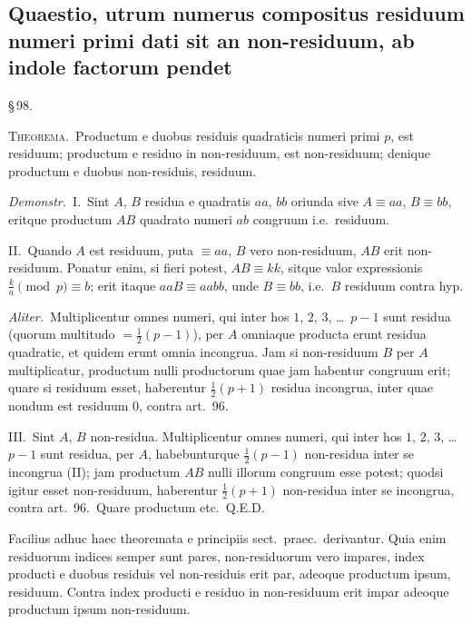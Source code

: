 \documentclass[12pt,a4paper]{article}
\theoremstyle{plain}
\theoremstyle{definition}
\theoremstyle{remark}
\begin{document}
\subsection*{Quaestio, utrum numerus compositus residuum numeri primi dati sit an non-residuum, ab indole factorum pendet}

\begin{center}\S\,98.\end{center}

\textsc{Theorema.}\ Productum e duobus residuis quadraticis numeri primi $p$, est residuum; productum e residuo in non-residuum, est non-residuum; denique productum e duobus non-residuis, residuum.

\textit{Demonstr.}\ I.\ Sint $A$, $B$ residua e quadratis $aa$, $bb$ oriunda sive $A \equiv aa$, $B \equiv bb$, eritque productum $AB$ quadrato numeri $ab$ congruum i.e.\ residuum.

II.\ Quando $A$ est residuum, puta $\equiv aa$, $B$ vero non-residuum, $AB$ erit non-residuum. Ponatur enim, si fieri potest, $AB \equiv kk$, sitque valor expressionis $\frac{k}{a} \pmod{p} \equiv b$; erit itaque $aaB \equiv aabb$, unde $B \equiv bb$, i.e.\ $B$ residuum contra hyp.

\textit{Aliter.}\ Multiplicentur omnes numeri, qui inter hos $1$, $2$, $3$, \dots\ $p-1$ sunt residua (quorum multitudo $= \frac{1}{2}(p-1)$), per $A$ omniaque producta erunt residua quadratic, et quidem erunt omnia incongrua. Jam si non-residuum $B$ per $A$ multiplicatur, productum nulli productorum quae jam habentur congruum erit; quare si residuum esset, haberentur $\frac{1}{2}(p+1)$ residua incongrua, inter quae nondum est residuum $0$, contra art.~96.

III.\ Sint $A$, $B$ non-residua. Multiplicentur omnes numeri, qui inter hos $1$, $2$, $3$, \dots\ $p-1$ sunt residua, per $A$, habebunturque $\frac{1}{2}(p-1)$ non-residua inter se incongrua (II); jam productum $AB$ nulli illorum congruum esse potest; quodsi igitur esset non-residuum, haberentur $\frac{1}{2}(p+1)$ non-residua inter se incongrua, contra art.~96.\ Quare productum etc.\ Q.E.D.

Facilius adhuc haec theoremata e principiis sect.\ praec.\ derivantur. Quia enim residuorum indices semper sunt pares, non-residuorum vero impares, index producti e duobus residuis vel non-residuis erit par, adeoque productum ipsum, residuum. Contra index producti e residuo in non-residuum erit impar adeoque productum ipsum non-residuum.
\end{document}
